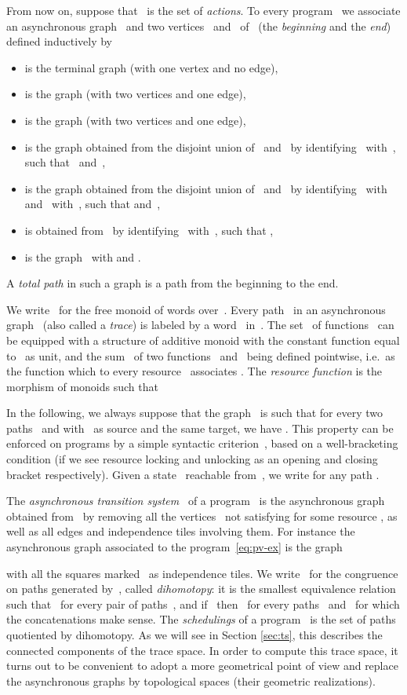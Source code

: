 \documentclass[orivec]{llncs} \usepackage[T1]{fontenc}
\newcommand{\ie}{i.e.~}
\begin{document}
{From now on, suppose that~ is the set of
\emph{actions}. To every program~ we associate an asynchronous graph~
and two vertices~ and~ of~ (the \emph{beginning} and the
\emph{end}) defined inductively by
\begin{itemize}
\item  is the terminal graph (with one vertex and no edge),
\item  is the graph  (with two vertices
  and one edge),
\item  is the graph  (with two
  vertices and one edge),
\item  is the graph obtained from the disjoint union of~ and~
  by identifying~ with~, such that~ and~,
\item  is the graph obtained from the disjoint union of~ and~
  by identifying~ with~ and~ with~, such
  that  and~,
\item  is obtained from~ by identifying~ with~, such
  that ,
\item  is the graph~ with 
  and .
\end{itemize}
A \emph{total path} in such a graph is a path from the beginning to the end.

We write~ for the free monoid of words over~. Every path~
in an asynchronous graph~ (also called a \emph{trace}) is labeled by a
word~ in~. The set~ of
functions~ can be equipped with a structure of additive monoid
with the constant function equal to~ as unit, and the sum~ of two
functions~ and~ being defined pointwise, \ie as the function which to
every resource~ associates \hbox{}. The
\emph{resource function}  is the morphism of monoids
such that

In the following, we always suppose that the graph~ is such that for every
two paths~ and \hbox{}
with~ as source and the same target, we have
\hbox{}. This property can be enforced on programs by
a simple syntactic criterion~\cite{fajstrup2000infinitely}, based on a
well-bracketing condition (if we see resource locking and unlocking as an
opening and closing bracket respectively). Given a state~ reachable
from~, we write \hbox{} for any path
\hbox{}.


The \emph{asynchronous transition system}~ of a program~ is the
asynchronous graph obtained from~ by removing all the vertices~ not
satisfying \hbox{} for some resource
, as well as all edges and independence tiles involving
them. For instance the asynchronous graph associated to the
program~\eqref{eq:pv-ex} is the graph

with all the squares marked~ as independence tiles. We write~ for the
congruence on paths generated by~, called \emph{dihomotopy}: it is the
smallest equivalence relation such that~ for every pair of
paths~, and if~ then~ for every paths~ and~ for which the concatenations make
sense. The \emph{schedulings} of a program~ is the set of
paths~ quotiented by dihomotopy.  As we will see in
Section \ref{sec:ts}, this describes the connected components of the trace
space. In order to compute this trace space, it turns out to be convenient to
adopt a more geometrical point of view and replace the asynchronous graphs by
topological spaces (their geometric realizations).





}
\end{document}
